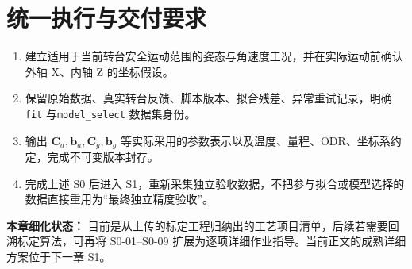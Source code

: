 \section{统一执行与交付要求}
\begin{enumerate}
\item 建立适用于当前转台安全运动范围的姿态与角速度工况，并在实际运动前确认外轴 X、内轴 Z 的坐标假设。
\item 保留原始数据、真实转台反馈、脚本版本、拟合残差、异常重试记录，明确\texttt{fit} 与\texttt{model\_select} 数据集身份。
\item 输出 $\mathbf C_a,\bm b_a,\mathbf C_g,\bm b_g$ 等实际采用的参数表示以及温度、量程、ODR、坐标系约定，完成不可变版本封存。
\item 完成上述 S0 后进入 S1，重新采集独立验收数据，不把参与拟合或模型选择的数据直接重用为“最终独立精度验收”。
\end{enumerate}
\begin{keynote}
\textbf{本章细化状态：} 目前是从上传的标定工程归纳出的工艺项目清单，后续若需要回溯标定算法，可再将 S0-01--S0-09 扩展为逐项详细作业指导。当前正文的成熟详细方案位于下一章 S1。
\end{keynote}
